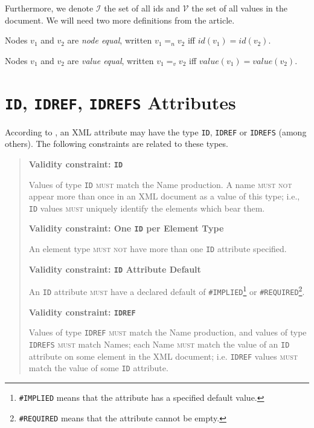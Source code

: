 Furthermore, we denote $\mathcal{I}$ the set of all ids and $\mathcal{V}$ the set of all values in the document. We will need two more definitions from the article.

\begin{define}
	Nodes $v_1$ and $v_2$ are \textit{node equal}, written $v_1 =_n v_2$ iff $id(v_1) = id(v_2)$.
\end{define}

\begin{define}
	Nodes $v_1$ and $v_2$ are \textit{value equal}, written $v_1 =_v v_2$ iff $value(v_1) = value(v_2)$.
\end{define}

\section{\texttt{ID}, \texttt{IDREF}, \texttt{IDREFS} Attributes}
\label{section-definitions-id-attributes}

According to \cite{Bray:08:EML}, an XML attribute may have the type \texttt{ID}, \texttt{IDREF} or \texttt{IDREFS} (among others). The following constraints are related to these types.

\begin{quote}
\textbf{Validity constraint: \texttt{ID}}

Values of type \texttt{ID} \textsc{must} match the Name production. A name \textsc{must not} appear more than once in an XML document as a value of this type; i.e., \texttt{ID} values \textsc{must} uniquely identify the elements which bear them.

\textbf{Validity constraint: One \texttt{ID} per Element Type}

An element type \textsc{must not} have more than one \texttt{ID} attribute specified.

\textbf{Validity constraint: \texttt{ID} Attribute Default}

An \texttt{ID} attribute \textsc{must} have a declared default of \texttt{\#IMPLIED}\footnote{\texttt{\#IMPLIED} means that the attribute has a specified default value.} or \texttt{\#REQUIRED}\footnote{\texttt{\#REQUIRED} means that the attribute cannot be empty.}.

\textbf{Validity constraint: \texttt{IDREF}}

Values of type \texttt{IDREF} \textsc{must} match the Name production, and values of type \texttt{IDREFS} \textsc{must} match Names; each Name \textsc{must} match the value of an \texttt{ID} attribute on some element in the XML document; i.e. \texttt{IDREF} values \textsc{must} match the value of some \texttt{ID} attribute.
\end{quote}


